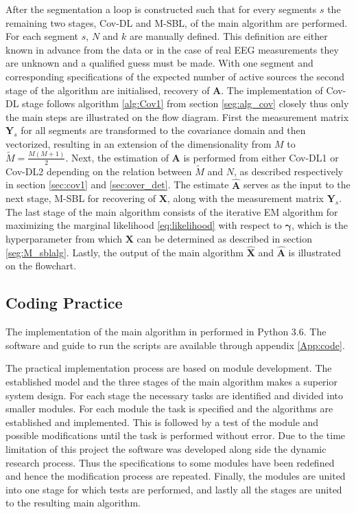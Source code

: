 After the segmentation a loop is constructed such that for every segments $s$ the remaining two stages, Cov-DL and M-SBL, of the main algorithm are performed. 
For each segment $s$, $N$ and $k$ are manually defined. 
This definition are either known in advance from the data or in the case of real EEG measurements they are unknown and a qualified guess must be made.
With one segment and corresponding specifications of the expected number of active sources the second stage of the algorithm are initialised, recovery of $\mathbf{A}$.
The implementation of Cov-DL stage follows algorithm \ref{alg:Cov1} from section \ref{seg:alg_cov} closely thus only the main steps are illustrated on the flow diagram.
First the measurement matrix $\mathbf{Y}_s$ for all segments are transformed to the covariance domain and then vectorized, resulting in an extension of the dimensionality from $M$ to $\widetilde{M} = \frac{M(M+1)}{2}$.
Next, the estimation of $\mathbf{A}$ is performed from either Cov-DL1 or Cov-DL2 depending on the relation between $\widetilde{M}$ and $N$, as described respectively in section \ref{sec:cov1} and \ref{sec:over_det}.
The estimate $\hat{\mathbf{A}}$ serves as the input to the next stage, M-SBL for recovering of $\mathbf{X}$, along with the measurement matrix $\mathbf{Y}_s$. 
The last stage of the main algorithm consists of the iterative EM algorithm for maximizing the marginal likelihood \eqref{eq:likelihood} with respect to $\boldsymbol{\gamma}$, which is the hyperparameter from which $\mathbf{X}$ can be determined as described in section \ref{seg:M_sblalg}. 
Lastly, the output of the main algorithm $\hat{\mathbf{X}}$ and $\hat{\mathbf{A}}$ is illustrated on the flowchart.

\subsection{Coding Practice}
The implementation of the main algorithm in performed in Python 3.6. The software and guide to run the scripts are available through appendix \ref{App:code}.

The practical implementation process are based on module development. 
The established model and the three stages of the main algorithm makes a superior system design. 
For each stage the necessary tasks are identified and divided into smaller modules. 
For each module the task is specified and the algorithms are established and implemented. 
This is followed by a test of the module and possible modifications until the task is performed without error. 
Due to the time limitation of this project the software was developed along side the dynamic research process. 
Thus the specifications to some modules have been redefined and hence the modification process are repeated. 
Finally, the modules are united into one stage for which tests are performed, and lastly all the stages are united to the resulting main algorithm.

